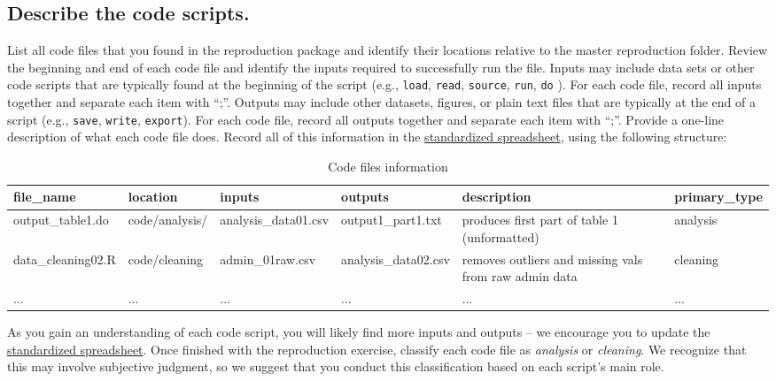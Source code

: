 \documentclass[]{book}
\begin{document}
\hypertarget{desc-scripts}{%
\subsection{Describe the code scripts.}\label{desc-scripts}}

List all code files that you found in the reproduction package and identify their locations relative to the master reproduction folder. Review the beginning and end of each code file and identify the inputs required to successfully run the file. Inputs may include data sets or other code scripts that are typically found at the beginning of the script (e.g., \texttt{load}, \texttt{read}, \texttt{source}, \texttt{run}, \texttt{do} ). For each code file, record all inputs together and separate each item with ``;''. Outputs may include other datasets, figures, or plain text files that are typically at the end of a script (e.g., \texttt{save}, \texttt{write}, \texttt{export}). For each code file, record all outputs together and separate each item with ``;''. Provide a one-line description of what each code file does. Record all of this information in the \href{https://docs.google.com/spreadsheets/d/1LUIdVFH0OfR70C7z07TYeE-uWzKI_JIeWUMaYhqEKK0/edit\#gid=1617799822\&range=A1}{standardized spreadsheet}, using the following structure:

\begin{table}

\caption{\label{tab:code-files-information}Code files information}
\centering
\begin{tabu} to 
\hline
file\_name & location & inputs & outputs & description & primary\_type\\
\hline
output\_table1.do & code/analysis/ & analysis\_data01.csv & output1\_part1.txt & produces first part of table 1 (unformatted) & analysis\\
\hline
data\_cleaning02.R & code/cleaning & admin\_01raw.csv & analysis\_data02.csv & removes outliers and missing vals from raw admin data & cleaning\\
\hline
... & ... & ... & ... & ... & ...\\
\hline
\end{tabu}
\end{table}

As you gain an understanding of each code script, you will likely find more inputs and outputs -- we encourage you to update the \href{https://docs.google.com/spreadsheets/d/1LUIdVFH0OfR70C7z07TYeE-uWzKI_JIeWUMaYhqEKK0/edit\#gid=1617799822\&range=A1}{standardized spreadsheet}. Once finished with the reproduction exercise, classify each code file as \emph{analysis} or \emph{cleaning}. We recognize that this may involve subjective judgment, so we suggest that you conduct this classification based on each script's main role.
\end{document}
